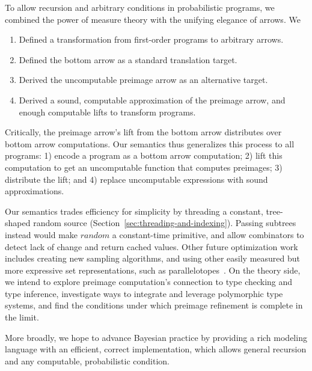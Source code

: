 To allow recursion and arbitrary conditions in probabilistic programs, we combined the power of measure theory with the unifying elegance of arrows. We
\begin{enumerate}
	\item Defined a transformation from first-order programs to arbitrary arrows.
	\item Defined the bottom arrow as a standard translation target.
	\item Derived the uncomputable preimage arrow as an alternative target.
	\item Derived a sound, computable approximation of the preimage arrow, and enough computable lifts to transform programs.
\end{enumerate}
Critically, the preimage arrow's lift from the bottom arrow distributes over bottom arrow computations.
Our semantics thus generalizes this process to all programs: 1) encode a program as a bottom arrow computation; 2) lift this computation to get an uncomputable function that computes preimages; 3) distribute the lift; and 4) replace uncomputable expressions with sound approximations.

Our semantics trades efficiency for simplicity by threading a constant, tree-shaped random source (Section~\ref{sec:threading-and-indexing}).
Passing subtrees instead would make $random$ a constant-time primitive, and allow combinators to detect lack of change and return cached values.
Other future optimization work includes creating new sampling algorithms, and using other easily measured but more expressive set representations, such as parallelotopes~\cite{cit:amato-2012tcs-parallelotopes}.
On the theory side, we intend to explore preimage computation's connection to type checking and type inference, investigate ways to integrate and leverage polymorphic type systems, and find the conditions under which preimage refinement is complete in the limit.

More broadly, we hope to advance Bayesian practice by providing a rich modeling language with an efficient, correct implementation, which allows general recursion and any computable, probabilistic condition.


